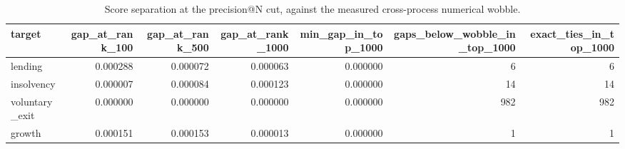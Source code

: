 \begin{table}
\caption{Score separation at the precision@N cut, against the measured cross-process numerical wobble.}
\label{tab:17_rank_gap_fragility}
\begin{tabular}{lrrrrrr}
\toprule
target & gap_at_rank_100 & gap_at_rank_500 & gap_at_rank_1000 & min_gap_in_top_1000 & gaps_below_wobble_in_top_1000 & exact_ties_in_top_1000 \\
\midrule
lending & 0.000288 & 0.000072 & 0.000063 & 0.000000 & 6 & 6 \\
insolvency & 0.000007 & 0.000084 & 0.000123 & 0.000000 & 14 & 14 \\
voluntary_exit & 0.000000 & 0.000000 & 0.000000 & 0.000000 & 982 & 982 \\
growth & 0.000151 & 0.000153 & 0.000013 & 0.000000 & 1 & 1 \\
\bottomrule
\end{tabular}
\end{table}
